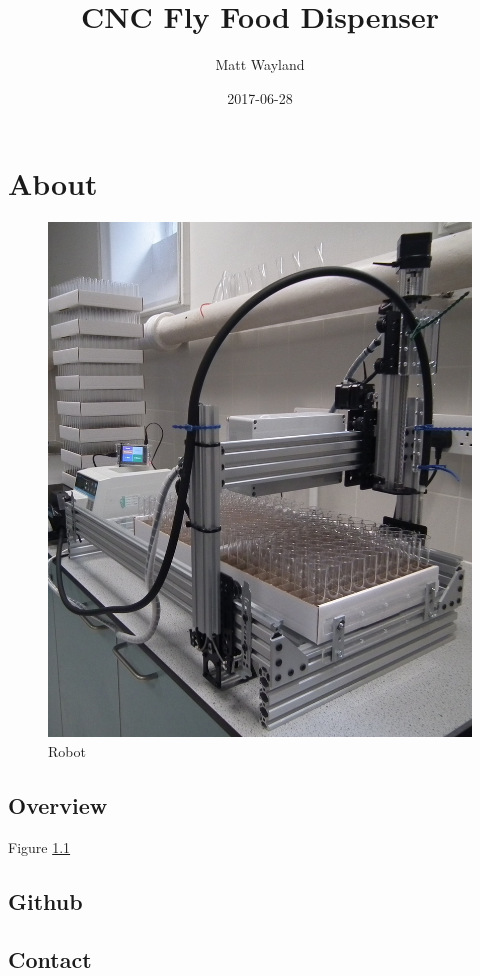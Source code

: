 \documentclass[]{book}
\title{CNC Fly Food Dispenser}
\author{Matt Wayland}
\date{2017-06-28}
\theoremstyle{definition}
\theoremstyle{definition}
\theoremstyle{remark}
\begin{document}
\maketitle

{
\setcounter{tocdepth}{1}
\tableofcontents
}
\chapter{About}\label{about}

\begin{figure}

{\centering \includegraphics[width=0.75\linewidth]{images/system} 

}

\caption{Robot}\label{fig:test}
\end{figure}

\section{Overview}\label{overview}

Figure \ref{fig:test}

\section{Github}\label{github}

\section{Contact}\label{contact}
\end{document}
